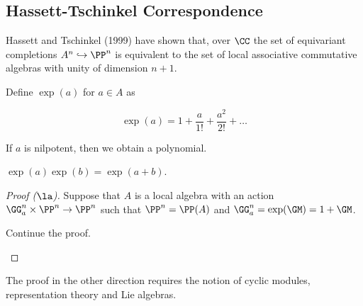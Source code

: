 \documentclass[11pt]{scrartcl}
\begin{document}
  \subsection{Hassett-Tschinkel Correspondence}

  Hassett and Tschinkel (1999) have shown that, over $\CC$ the set of
  equivariant completions $A^{n} \hookrightarrow \PP^{n}$ is
  equivalent to the set of local associative commutative algebras with
  unity of dimension $n+1$.

  Define $\exp(a)$ for $a\in A$ as
  
  \begin{equation*}
    \exp(a) = 1 + \frac{a}{1!} + \frac{a^{2}}{2!} + \dots
  \end{equation*}

  If $a$ is nilpotent, then we obtain a polynomial.

  \begin{exercise}

    $\exp(a)\exp(b) = \exp(a+b)$.

  \end{exercise}

  \begin{proof}[Proof ($\la$)]
    \hfill

    Suppose that $A$ is a local algebra with an action
    $\GG_{a}^{n}\times \PP^{n} \to \PP^{n}$ such that
    $\PP^{n} = \PP(A)$ and $\GG_{a}^{n} = \exp(\GM) = 1+\GM$.

    \begin{exercise}

      Continue the proof.

    \end{exercise}
  \end{proof}

  The proof in the other direction requires the notion of cyclic
  modules, representation theory and Lie algebras.




    
    

  

  
\end{document}
